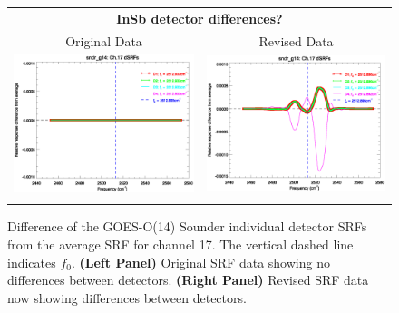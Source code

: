 \begin{figure}[htp]
  \centering
  \begin{tabular}{c c}
    \multicolumn{2}{c}{\textsf{\bfseries InSb detector differences?}} \\
    \hspace{1.5em}\textsf{Original Data} &
    \hspace{1.5em}\textsf{Revised Data} \\
    \includegraphics[scale=0.5,trim=0 40 0 0]{graphics/dsrf_anomaly/original/sndr_g14.ch17.srf.eps} &
    \includegraphics[scale=0.5,trim=0 40 0 0]{graphics/dsrf_anomaly/revised/sndr_g14.ch17.srf.eps} \\\\
  \end{tabular}
  \caption{Difference of the GOES-O(14) Sounder individual detector SRFs from the average SRF for channel 17. The vertical dashed line indicates $f_0$. \textbf{(Left Panel)} Original SRF data showing no differences between detectors. \textbf{(Right Panel)} Revised SRF data now showing differences between detectors.}
  \label{fig:sndr_g14.ch17.dsrf_anomaly}
\end{figure}

